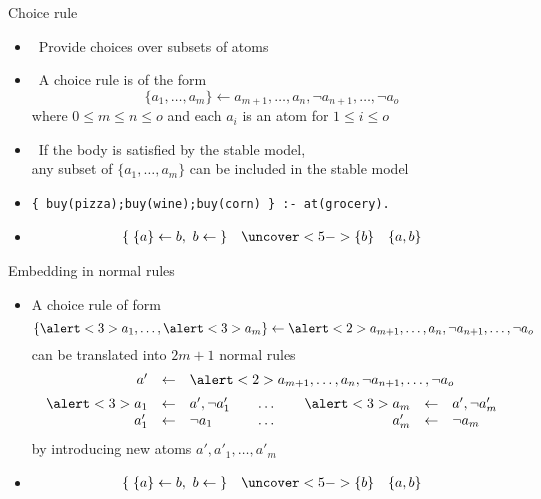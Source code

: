 \begin{frame}[fragile]{Choice rule}
  \label{eqn:choice:rule}
  \begin{itemize}
  \item {} \ Provide choices over subsets of atoms
  \item {} \ A \alert{choice rule} is of the form
    \[
    \{a_1,\dots,a_m\}\leftarrow a_{m+1},\dots,a_n,\neg a_{n+1},\dots,\neg a_o
    \]
    where $0\leq m\leq n\leq o$ and each $a_i$ is an atom for $1\leq i\leq o$
    \smallskip
  \item<2->  \ If the body is satisfied by the stable model,\\
    any subset of $\{a_1,\dots,a_m\}$ can be included in the stable model
    \medskip
  \item<3->   %
\begin{lstlisting}[basicstyle=\ttfamily\small]
{ buy(pizza);buy(wine);buy(corn) } :- at(grocery).
\end{lstlisting}
  \item<4-> 
    \begin{align*}
      & \{\;\{a\}\leftarrow b,\ b\leftarrow\;\}&\uncover<5->{\{b\}\quad\{a,b\}}
    \end{align*}
  \end{itemize}
\end{frame}
\begin{frame}{Embedding in normal rules}
  \begin{itemize}
  \item A choice rule of form
    \[
    \{\alert<3>{a_1},\dots,\alert<3>{a_m}\}\leftarrow \alert<2>{a_{m+1},\dots,a_n,\neg a_{n+1},\dots,\neg a_o}
    \]
    can be translated into $2m+1$ normal rules
    \[
    \begin{array}{rcl@{\qquad}c@{\qquad}rcl}
      a'&\leftarrow&\multicolumn{5}{l}{\alert<2>{a_{m+1},\dots,a_n, \neg a_{n+1},\dots,\neg a_o}}
      \\[5pt]
      \alert<3>{a_1}&\leftarrow&a',\neg a'_1&\dots&\alert<3>{a_m}&\leftarrow&a',\neg a'_m\\
               a'_1 &\leftarrow&  \neg a_1 &\dots&         a'_m &\leftarrow&  \neg a_m
    \end{array}
    \]
    by introducing new atoms $a',a'_1,\dots,a'_m$
  \item<2-> 
    \begin{align*}
      & \{\;\{a\}\leftarrow b,\ b\leftarrow\;\}&\uncover<5->{\{b\}\quad\{a,b\}}
    \end{align*}
  \end{itemize}
\end{frame}
%
